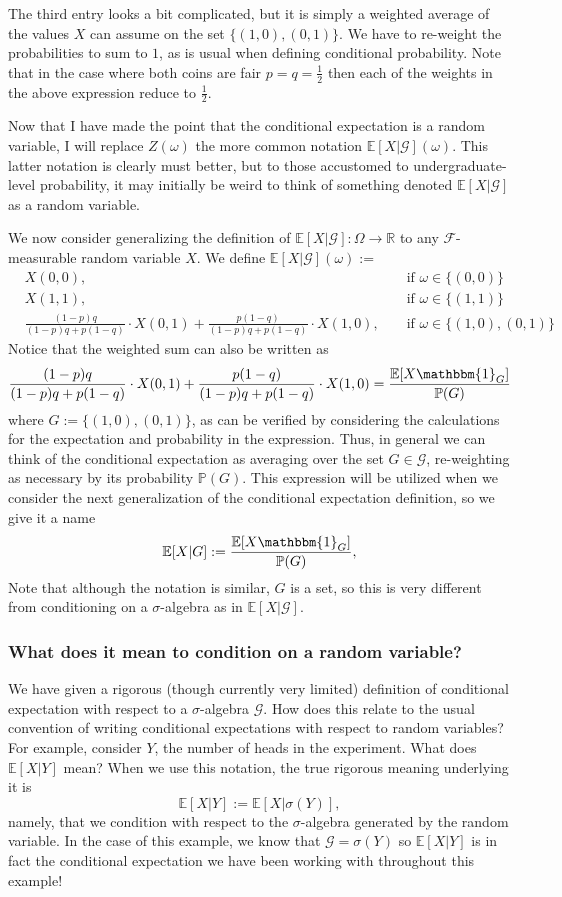 \documentclass[12pt]{article}
\newcommand{\E}{\mathbb{E}}
\newcommand{\R}{\mathbb{R}}
\newcommand{\Prob}{\mathbb{P}}
\begin{document}
The third entry looks a bit complicated, but it is simply a weighted average of the values $X$ can assume on the set $\{(1, 0), (0, 1)\}$. We have to re-weight the probabilities to sum to $1$, as is usual when defining 
conditional probability. Note that in the case where both coins are fair $p = q = \frac{1}{2}$ then each of the weights in the above expression reduce to $\frac{1}{2}$. 

Now that I have made the point that the conditional expectation is a random variable, I will replace $Z(\omega)$ the more common notation $\E[X|\mathcal{G}](\omega)$. This latter notation is clearly must better, 
but to those accustomed to undergraduate-level probability, it may initially be weird to think of something denoted $\E[X|\mathcal{G}]$ as a random variable. 

We now consider generalizing the definition of $\E[X|\mathcal{G}]: \Omega \to \R$ to any $\mathcal{F}$-measurable random variable $X$. We define $\E[X|\mathcal{G}](\omega) := $
\begin{align*}
&X(0, 0), &&\text{ if } \omega \in \{(0, 0)\} \\
&X(1, 1), &&\text{ if } \omega \in \{(1, 1)\} \\
&\frac{(1 - p)q}{(1 - p)q + p(1 - q)} \cdot X(0, 1) + \frac{p(1 - q)}{(1 - p)q + p(1 - q)} \cdot X(1, 0), &&\text{ if } \omega \in \{(1, 0), (0, 1)\}
\end{align*}
Notice that the weighted sum can also be written as 
\[\frac{(1 - p)q}{(1 - p)q + p(1 - q)} \cdot X(0, 1) + \frac{p(1 - q)}{(1 - p)q + p(1 - q)} \cdot X(1, 0) = \frac{\E[X \mathbbm{1}_G]}{\Prob(G)}\]
where $G := \{(1, 0), (0, 1)\}$, as can be verified by considering the calculations for the expectation and probability in the expression. Thus, in general we can think of the conditional expectation as averaging 
over the set $G \in \mathcal{G}$, re-weighting as necessary by its probability $\Prob(G)$. This expression will be utilized when we consider the next generalization of the conditional expectation definition, so 
we give it a name
\[\E[X|G] := \frac{\E[X \mathbbm{1}_G]}{\Prob(G)},\]
Note that although the notation is similar, $G$ is a set, so this is very different from conditioning on a $\sigma$-algebra as in $\E[X|\mathcal{G}]$. 

\subsubsection{What does it mean to condition on a random variable?}
We have given a rigorous (though currently very limited) definition of conditional expectation with respect to a $\sigma$-algebra $\mathcal{G}$. How does this relate to the usual convention of writing conditional 
expectations with respect to random variables? For example, consider $Y$, the number of heads in the experiment. What does $\E[X|Y]$ mean? When we use this notation, the true rigorous meaning underlying it 
is 
\[\E[X|Y] := \E[X|\sigma(Y)],\]
namely, that we condition with respect to the $\sigma$-algebra generated by the random variable. In the case of this example, we know that $\mathcal{G} = \sigma(Y)$ so $\E[X|Y]$ is in fact the conditional expectation 
we have been working with throughout this example!
\end{document}
